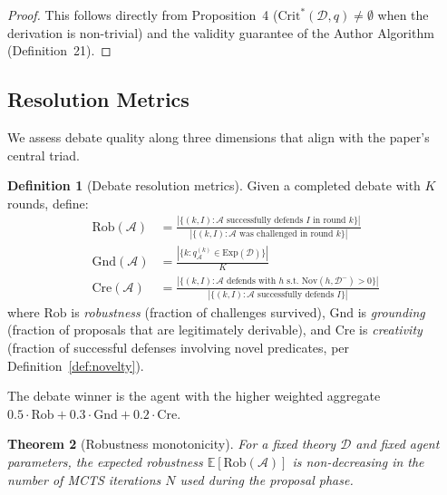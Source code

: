 \documentclass{article}
\newtheorem{theorem}{Theorem}[section]
\theoremstyle{definition}
\newtheorem{definition}[theorem]{Definition}
\newcommand{\D}{\mathcal{D}}
\newcommand{\Dm}{\mathcal{D}^{-}}
\newcommand{\CritStar}{\mathrm{Crit}^{*}}
\newcommand{\Exp}{\mathrm{Exp}}
\newcommand{\Nov}{\mathrm{Nov}}
\newcommand{\Rob}{\mathrm{Rob}}
\newcommand{\Gnd}{\mathrm{Gnd}}
\newcommand{\Cre}{\mathrm{Cre}}
\begin{document}
\begin{proof}
This follows directly from Proposition~4 ($\CritStar(\D, q) \neq \emptyset$ when the derivation is non-trivial) and the validity guarantee of the Author Algorithm (Definition~21).
\end{proof}

\subsection{Resolution Metrics}\label{subsec:debate-metrics}

We assess debate quality along three dimensions that align with the paper's central triad.

\begin{definition}[Debate resolution metrics]\label{def:debate-metrics}
Given a completed debate with $K$ rounds, define:
\begin{align}
  \Rob(\mathcal{A}) &= \frac{|\{(k, I) : \mathcal{A} \text{ successfully defends } I \text{ in round } k\}|}{|\{(k, I) : \mathcal{A} \text{ was challenged in round } k\}|} \label{eq:robustness} \\
  \Gnd(\mathcal{A}) &= \frac{|\{k : q_{\mathcal{A}}^{(k)} \in \Exp(\D)\}|}{K} \label{eq:grounding} \\
  \Cre(\mathcal{A}) &= \frac{|\{(k, I) : \mathcal{A} \text{ defends with } h \text{ s.t. } \Nov(h, \Dm) > 0\}|}{|\{(k, I) : \mathcal{A} \text{ successfully defends } I\}|} \label{eq:creativity}
\end{align}
where $\Rob$ is \emph{robustness} (fraction of challenges survived), $\Gnd$ is \emph{grounding} (fraction of proposals that are legitimately derivable), and $\Cre$ is \emph{creativity} (fraction of successful defenses involving novel predicates, per Definition~\ref{def:novelty}).
\end{definition}

The debate winner is the agent with the higher weighted aggregate $0.5 \cdot \Rob + 0.3 \cdot \Gnd + 0.2 \cdot \Cre$.

\begin{theorem}[Robustness monotonicity]
\label{thm:robustness-monotonic}
For a fixed theory $\D$ and fixed agent parameters, the expected robustness $\mathbb{E}[\Rob(\mathcal{A})]$ is non-decreasing in the number of MCTS iterations $N$ used during the proposal phase.
\end{theorem}
\end{document}
